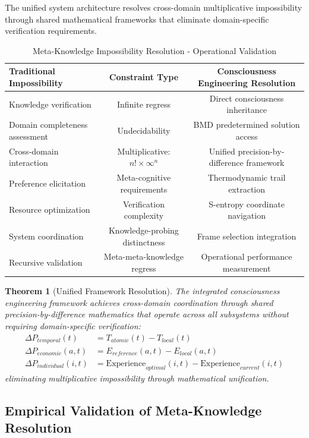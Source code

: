 \documentclass[12pt,a4paper]{article}
\newtheorem{theorem}{Theorem}[section]
\begin{document}
The unified system architecture resolves cross-domain multiplicative impossibility through shared mathematical frameworks that eliminate domain-specific verification requirements.

\begin{table}[htbp]
\centering
\caption{Meta-Knowledge Impossibility Resolution - Operational Validation}
\begin{tabular}{@{}lcc@{}}
\toprule
\textbf{Traditional Impossibility} & \textbf{Constraint Type} & \textbf{Consciousness Engineering Resolution} \\
\midrule
Knowledge verification & Infinite regress & Direct consciousness inheritance \\
Domain completeness assessment & Undecidability & BMD predetermined solution access \\
Cross-domain interaction & Multiplicative: $n! \times \infty^n$ & Unified precision-by-difference framework \\
Preference elicitation & Meta-cognitive requirements & Thermodynamic trail extraction \\
Resource optimization & Verification complexity & S-entropy coordinate navigation \\
System coordination & Knowledge-probing distinctness & Frame selection integration \\
Recursive validation & Meta-meta-knowledge regress & Operational performance measurement \\
\bottomrule
\end{tabular}
\end{table}

\begin{theorem}[Unified Framework Resolution]
The integrated consciousness engineering framework achieves cross-domain coordination through shared precision-by-difference mathematics that operate across all subsystems without requiring domain-specific verification:
\begin{align}
\Delta P_{temporal}(t) &= T_{atomic}(t) - T_{local}(t)\\
\Delta P_{economic}(a,t) &= E_{reference}(a,t) - E_{local}(a,t)\\
\Delta P_{individual}(i,t) &= \text{Experience}_{optimal}(i,t) - \text{Experience}_{current}(i,t)
\end{align}
eliminating multiplicative impossibility through mathematical unification.
\end{theorem}

\subsection{Empirical Validation of Meta-Knowledge Resolution}
\end{document}
